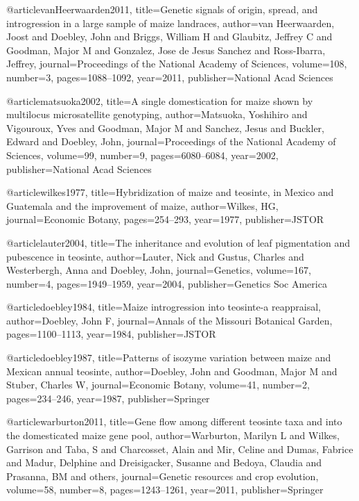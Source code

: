 @article{vanHeerwaarden2011,
  title={Genetic signals of origin, spread, and introgression in a large sample of maize landraces},
  author={van Heerwaarden, Joost and Doebley, John and Briggs, William H and Glaubitz, Jeffrey C and Goodman, Major M and Gonzalez, Jose de Jesus Sanchez and Ross-Ibarra, Jeffrey},
  journal={Proceedings of the National Academy of Sciences},
  volume={108},
  number={3},
  pages={1088--1092},
  year={2011},
  publisher={National Acad Sciences}
}

@article{matsuoka2002,
  title={A single domestication for maize shown by multilocus microsatellite genotyping},
  author={Matsuoka, Yoshihiro and Vigouroux, Yves and Goodman, Major M and Sanchez, Jesus and Buckler, Edward and Doebley, John},
  journal={Proceedings of the National Academy of Sciences},
  volume={99},
  number={9},
  pages={6080--6084},
  year={2002},
  publisher={National Acad Sciences}
}

@article{wilkes1977,
  title={Hybridization of maize and teosinte, in Mexico and Guatemala and the improvement of maize},
  author={Wilkes, HG},
  journal={Economic Botany},
  pages={254--293},
  year={1977},
  publisher={JSTOR}
}

@article{lauter2004,
  title={The inheritance and evolution of leaf pigmentation and pubescence in teosinte},
  author={Lauter, Nick and Gustus, Charles and Westerbergh, Anna and Doebley, John},
  journal={Genetics},
  volume={167},
  number={4},
  pages={1949--1959},
  year={2004},
  publisher={Genetics Soc America}
}

@article{doebley1984,
  title={Maize introgression into teosinte-a reappraisal},
  author={Doebley, John F},
  journal={Annals of the Missouri Botanical Garden},
  pages={1100--1113},
  year={1984},
  publisher={JSTOR}
}

@article{doebley1987,
  title={Patterns of isozyme variation between maize and Mexican annual teosinte},
  author={Doebley, John and Goodman, Major M and Stuber, Charles W},
  journal={Economic Botany},
  volume={41},
  number={2},
  pages={234--246},
  year={1987},
  publisher={Springer}
}

@article{warburton2011,
  title={Gene flow among different teosinte taxa and into the domesticated maize gene pool},
  author={Warburton, Marilyn L and Wilkes, Garrison and Taba, S and Charcosset, Alain and Mir, Celine and Dumas, Fabrice and Madur, Delphine and Dreisigacker, Susanne and Bedoya, Claudia and Prasanna, BM and others},
  journal={Genetic resources and crop evolution},
  volume={58},
  number={8},
  pages={1243--1261},
  year={2011},
  publisher={Springer}
}


